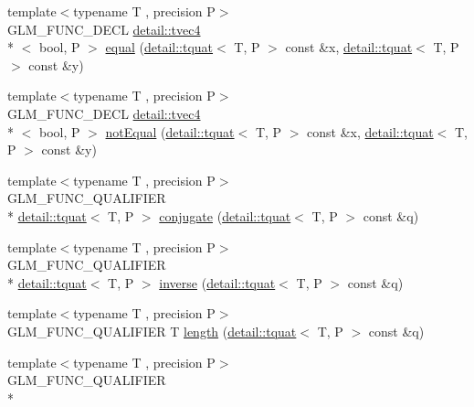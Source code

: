 \begin{DoxyCompactItemize}
\item 
{\footnotesize template$<$typename T , precision P$>$ }\\G\-L\-M\-\_\-\-F\-U\-N\-C\-\_\-\-D\-E\-C\-L \hyperlink{structglm_1_1detail_1_1tvec4}{detail\-::tvec4}\\*
$<$ bool, P $>$ \hyperlink{group__gtc__quaternion_ga32ff2cc6fb576639a6237d8d8ed5818b}{equal} (\hyperlink{structglm_1_1detail_1_1tquat}{detail\-::tquat}$<$ T, P $>$ const \&x, \hyperlink{structglm_1_1detail_1_1tquat}{detail\-::tquat}$<$ T, P $>$ const \&y)
\item 
{\footnotesize template$<$typename T , precision P$>$ }\\G\-L\-M\-\_\-\-F\-U\-N\-C\-\_\-\-D\-E\-C\-L \hyperlink{structglm_1_1detail_1_1tvec4}{detail\-::tvec4}\\*
$<$ bool, P $>$ \hyperlink{group__gtc__quaternion_gaa3a8cf1aa580e435ca96acafbd7870a5}{not\-Equal} (\hyperlink{structglm_1_1detail_1_1tquat}{detail\-::tquat}$<$ T, P $>$ const \&x, \hyperlink{structglm_1_1detail_1_1tquat}{detail\-::tquat}$<$ T, P $>$ const \&y)
\item 
{\footnotesize template$<$typename T , precision P$>$ }\\G\-L\-M\-\_\-\-F\-U\-N\-C\-\_\-\-Q\-U\-A\-L\-I\-F\-I\-E\-R \\*
\hyperlink{structglm_1_1detail_1_1tquat}{detail\-::tquat}$<$ T, P $>$ \hyperlink{group__gtc__quaternion_gaf78006c47276b151777fc194cf11a688}{conjugate} (\hyperlink{structglm_1_1detail_1_1tquat}{detail\-::tquat}$<$ T, P $>$ const \&q)
\item 
{\footnotesize template$<$typename T , precision P$>$ }\\G\-L\-M\-\_\-\-F\-U\-N\-C\-\_\-\-Q\-U\-A\-L\-I\-F\-I\-E\-R \\*
\hyperlink{structglm_1_1detail_1_1tquat}{detail\-::tquat}$<$ T, P $>$ \hyperlink{group__gtc__quaternion_ga6613ef61cb980a18f19ece5f421564da}{inverse} (\hyperlink{structglm_1_1detail_1_1tquat}{detail\-::tquat}$<$ T, P $>$ const \&q)
\item 
{\footnotesize template$<$typename T , precision P$>$ }\\G\-L\-M\-\_\-\-F\-U\-N\-C\-\_\-\-Q\-U\-A\-L\-I\-F\-I\-E\-R T \hyperlink{group__gtc__quaternion_ga3406ab83e2cafd4034f359957e942410}{length} (\hyperlink{structglm_1_1detail_1_1tquat}{detail\-::tquat}$<$ T, P $>$ const \&q)
\item 
{\footnotesize template$<$typename T , precision P$>$ }\\G\-L\-M\-\_\-\-F\-U\-N\-C\-\_\-\-Q\-U\-A\-L\-I\-F\-I\-E\-R \\*

\end{DoxyCompactItemize}
